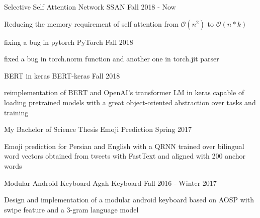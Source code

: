 

\begin{cventries}

\cventry
    {Selective Self Attention Network} %
    {SSAN} %
    {} %
    {Fall 2018 - Now} %
    {
      \begin{cvitems} %
        \item {Reducing the memory requirement of self attention from $\mathcal{O}(n^{2})$ to $\mathcal{O}(n*k)$}
      \end{cvitems}
    }
    
\cventry
	{fixing a bug in pytorch}
	{PyTorch}
	{}
	{Fall 2018}
	{
		\begin{cvitems}
			\item {fixed a bug in torch.norm function and another one in torch.jit parser}
		\end{cvitems}
	}
    
\cventry
	{BERT in keras}
	{BERT-keras}
	{}
	{Fall 2018}
	{
		\begin{cvitems}
			\item {reimplementation of BERT and OpenAI's transformer LM in keras capable of loading pretrained models with a great object-oriented abstraction over tasks and training}
		\end{cvitems}
	}

\cventry
    {My Bachelor of Science Thesis} %
    {Emoji Prediction} %
    {} %
    {Spring 2017} %
    {
      \begin{cvitems} %
        \item {Emoji prediction for Persian and English with a QRNN trained over bilingual word vectors obtained from tweets with FastText and aligned with 200 anchor words}
      \end{cvitems}
    }

\cventry
    {Modular Android Keyboard} %
    {Agah Keyboard} %
    {} %
    {Fall 2016 - Winter 2017} %
    {
      \begin{cvitems} %
        \item {Design and implementation of a modular android keyboard based on AOSP with swipe feature and a 3-gram language model}
      \end{cvitems}
    }


\end{cventries}
